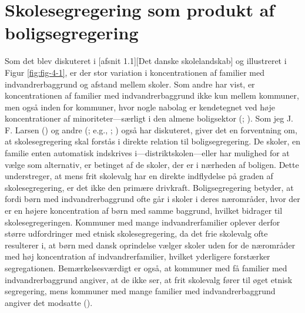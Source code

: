 \documentclass[
]{book}
\begin{document}
\section{Skolesegregering som produkt af boligsegregering}\label{skolesegregering-som-produkt-af-boligsegregering}

Som det blev diskuteret i {[}afsnit 1.1{]}{[}Det danske skolelandskab{]} og illustreret i Figur \ref{fig:fig-4-1}, er der stor variation i koncentrationen af familier med indvandrerbaggrund og afstand mellem skoler. Som andre har vist, er koncentrationen af familier med indvandrerbaggrund ikke kun mellem kommuner, men også inden for kommuner, hvor nogle nabolag er kendetegnet ved høje koncentrationer af minoriteter---særligt i den almene boligsektor (; ). Som jeg J. F. Larsen () og andre (; e.g., ; ) også har diskuteret, giver det en forventning om, at skolesegregering skal forstås i direkte relation til boligsegregering. De skoler, en familie enten automatisk indskrives i---distriktskolen---eller har mulighed for at vælge som alternativ, er betinget af de skoler, der er i nærheden af boligen. Dette understreger, at mens frit skolevalg har en direkte indflydelse på graden af skolesegregering, er det ikke den primære drivkraft. Boligsegregering betyder, at fordi børn med indvandrerbaggrund ofte går i skoler i deres nærområder, hvor der er en højere koncentration af børn med samme baggrund, hvilket bidrager til skolesegregeringen. Kommuner med mange indvandrerfamilier oplever derfor større udfordringer med etnisk skolesegregering, da det frie skolevalg ofte resulterer i, at børn med dansk oprindelse vælger skoler uden for de nærområder med høj koncentration af indvandrerfamilier, hvilket yderligere forstærker segregationen. Bemærkelsesværdigt er også, at kommuner med få familier med indvandrerbaggrund angiver, at de ikke ser, at frit skolevalg fører til øget etnisk segregering, mens kommuner med mange familier med indvandrerbaggrund angiver det modsatte ().
\end{document}
